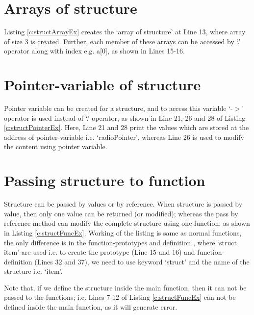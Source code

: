 

\section{Arrays of structure}
Listing \ref{c:structArrayEx} creates the `array of structure' at Line 13, where array of size 3 is created. Further, each member of these arrays can be accessed by `.' operator along with index e.g. a[0], as shown in Lines 15-16. 


\section{Pointer-variable of structure}
Pointer variable can be created for a structure, and to access this variable `-$>$' operator is used instead of `.' operator, as shown in Line 21, 26 and 28 of Listing \ref{c:structPointerEx}. Here, Line 21 and 28 print the values which are stored at the address of pointer-variable i.e. `radioPointer', whereas Line 26 is used to modify the content using pointer variable. 


\section{Passing structure to function}
Structure can be passed by values or by reference. When structure is passed by value, then only one value can be returned (or modified); whereas the pass by reference method can modify the complete structure using one function, as shown in Listing \ref{c:structFuncEx}. Working of the listing is same as normal functions, the only difference is in the function-prototypes and definition , where `struct item' are used i.e. to create the prototype (Line 15 and 16) and function-definition (Lines 32 and 37), we need to use keyword `struct' and the name of the structure i.e. `item'. 
\begin{noNumBox}
	Note that, if we define the structure inside the main function, then it can not be passed to the functions; i.e. Lines 7-12 of Listing \ref{c:structFuncEx} can not be defined inside the main function, as it will generate error. 
\end{noNumBox}



